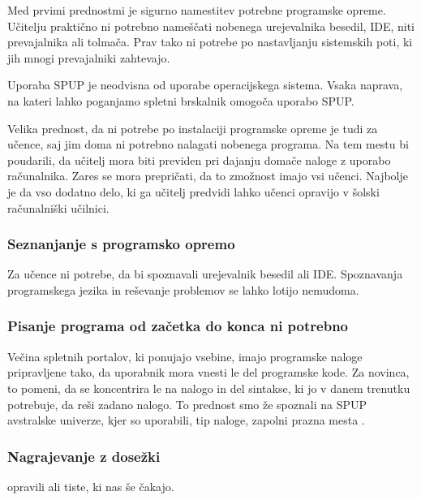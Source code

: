 Med prvimi prednostmi je sigurno namestitev potrebne programske
opreme. Učitelju praktično ni potrebno nameščati nobenega urejevalnika
besedil, IDE, niti prevajalnika ali tolmača. Prav tako ni potrebe po
nastavljanju sistemskih poti, ki jih mnogi prevajalniki zahtevajo.

Uporaba SPUP je neodvisna od uporabe operacijskega sistema. Vsaka
naprava, na kateri lahko poganjamo spletni brskalnik omogoča uporabo
SPUP.

Velika prednost, da ni potrebe po instalaciji programske opreme je
tudi za učence, saj jim doma ni potrebno nalagati nobenega
programa. Na tem mestu bi poudarili, da učitelj mora biti previden pri
dajanju domače naloge z uporabo računalnika. Zares se mora prepričati,
da to zmožnost imajo vsi učenci. Najbolje je da vso dodatno delo, ki
ga učitelj predvidi lahko učenci opravijo v šolski računalniški
učilnici.

\subsubsection{Seznanjanje s programsko opremo}
\label{sec:Seznanjanje_s_prog_opremo}

Za učence ni potrebe, da bi spoznavali urejevalnik besedil ali
IDE. Spoznavanja programskega jezika in reševanje problemov se lahko
lotijo nemudoma.


\subsubsection{Pisanje programa od začetka do konca ni potrebno}
\label{sec:pisanj_celega_progama}

Večina spletnih portalov, ki ponujajo vsebine, imajo programske naloge
pripravljene tako, da uporabnik mora vnesti le del programske kode. Za
novinca, to pomeni, da se koncentrira le na nalogo in del sintakse, ki
jo v danem trenutku potrebuje, da reši zadano nalogo. To prednost smo
že spoznali na SPUP avstralske univerze, kjer so uporabili, tip
naloge, zapolni prazna mesta \cite{thesisAWebP}.

\subsubsection{Nagrajevanje z dosežki}
\label{sec:nagrajevanje_s_dosežkov}






opravili ali tiste, ki nas še čakajo.

